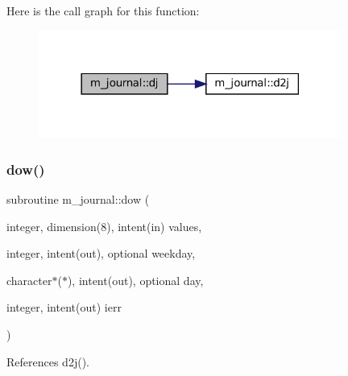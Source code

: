 Here is the call graph for this function\+:\nopagebreak
\begin{figure}[H]
\begin{center}
\leavevmode
\includegraphics[width=282pt]{namespacem__journal_a649265e689819cb284a82eb80c49df49_cgraph}
\end{center}
\end{figure}
\mbox{\label{namespacem__journal_a40b5e01c631024472f21521c9705881a}} 
\subsubsection{\texorpdfstring{dow()}{dow()}}
{\footnotesize\ttfamily subroutine m\+\_\+journal\+::dow (\begin{DoxyParamCaption}\item[{integer, dimension(8), intent(in)}]{values,  }\item[{integer, intent(out), optional}]{weekday,  }\item[{character$\ast$($\ast$), intent(out), optional}]{day,  }\item[{integer, intent(out)}]{ierr }\end{DoxyParamCaption})\hspace{0.3cm}{\ttfamily [private]}}



References d2j().

